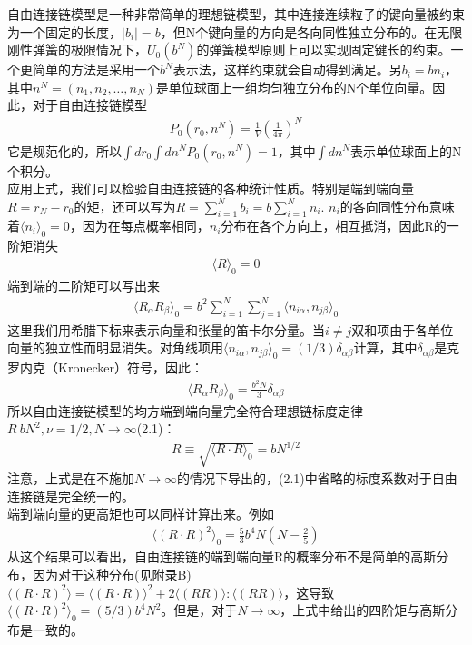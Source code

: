 自由连接链模型是一种非常简单的理想链模型，其中连接连续粒子的键向量被约束为一个固定的长度，$|b_{i}|=b$，但N个键向量的方向是各向同性独立分布的。在无限刚性弹簧的极限情况下，$U_0(b^{N})$的弹簧模型原则上可以实现固定键长的约束。一个更简单的方法是采用一个$b^{N}$表示法，这样约束就会自动得到满足。另$b_{i}=bn_{i}$，其中$n^{N}=(n_1,n_2,\ldots,n_{N})$是单位球面上一组均匀独立分布的N个单位向量。因此，对于自由连接链模型\\
\begin{gather}
P_0(r_0,n^{N})=\frac{1}{V} (\frac{1}{4 \pi})^{N}
\label{2.8}
\end{gather}
它是规范化的，所以$\int dr_0\int dn^{N}P_0(r_0,n^{N})=1$，其中$\int dn^{N}$表示单位球面上的N个积分。\\
应用上式，我们可以检验自由连接链的各种统计性质。特别是端到端向量$R=r_{N}-r_0$的矩，还可以写为$R=\sum _{i=1}^{N} b_{i}=b \sum _{i=1}^{N} n_{i}$.
$n_{i}$的各向同性分布意味着$\langle n_{i}\rangle _{0}=0$，因为在每点概率相同，$n_{i}$分布在各个方向上，相互抵消，因此R的一阶矩消失\\
\begin{gather}
\langle R \rangle_{0}=0
\label{2.9}
\end{gather}
端到端的二阶矩可以写出来\\
\begin{gather}
\langle R_{\alpha} R_{\beta}\rangle_{0}=b^2 \sum _{i=1}^{N} \sum _{j=1}^{N} \langle n_{i \alpha},n_{j \beta} \rangle_{0}
\label{2.10}
\end{gather}
这里我们用希腊下标来表示向量和张量的笛卡尔分量。当$i\neq j$双和项由于各单位向量的独立性而明显消失。对角线项用$\langle n_{i \alpha},n_{j \beta} \rangle_{0}=(1/3)\delta_{\alpha  \beta }$计算，其中$\delta_{\alpha \beta }$是克罗内克（Kronecker）符号，因此：\\
\begin{gather}
\langle R_{\alpha} R_{\beta}\rangle_{0}=\frac{b^{2}N}{3}\delta_{\alpha \beta }
\label{2.11}
\end{gather}
所以自由连接链模型的均方端到端向量完全符合理想链标度定律$R~bN^2,\nu=1/2,N \rightarrow \infty $(2.1)：\\
\begin{gather}
R\equiv \sqrt{\langle R \cdot R\rangle _{0}}=bN^{1/2}
\label{2.12}
\end{gather}
注意，上式是在不施加$N\rightarrow \infty$的情况下导出的，(2.1)中省略的标度系数对于自由连接链是完全统一的。\\

端到端向量的更高矩也可以同样计算出来。例如\\
\begin{gather}
\langle (R \cdot R)^2 \rangle_{0}=\frac{5}{3}b^4N(N-\frac{2}{5})
\label{2.13}
\end{gather}
从这个结果可以看出，自由连接链的端到端向量R的概率分布不是简单的高斯分布，因为对于这种分布(见附录B)$\langle (R \cdot R)^2 \rangle=\langle (R \cdot R) \rangle^2+2\langle (R R)\rangle:\langle (R R)\rangle$，这导致$\langle (R \cdot R)^2 \rangle_{0}=(5/3)b^4N^2$。但是，对于$N\rightarrow \infty$，上式中给出的四阶矩与高斯分布是一致的。\\

